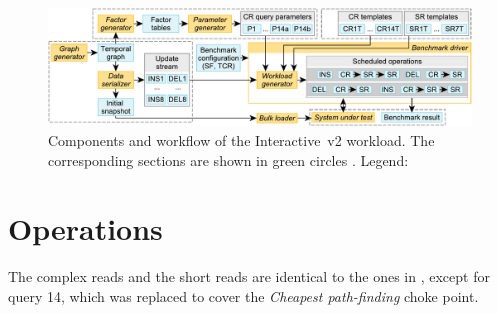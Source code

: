 \begin{figure}[htb]
    \centering
    \includegraphics[scale=\yedscale]{figures/interactive-v2-components}
    \caption{
        Components and workflow of the Interactive~v2 workload.
        The corresponding sections are shown in green circles \Circled{\textsf{\scriptsize \S}}.
        Legend:
    }
    \label{fig:interactive-components}
\end{figure}

\section{Operations}

The complex reads and the short reads are identical to the ones in \interactivevone, except for query 14, which was replaced to cover the \emph{Cheapest path-finding} choke point.

